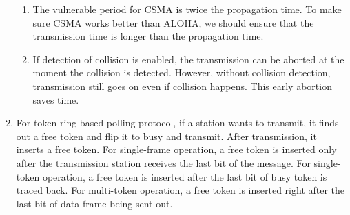 \documentclass{article}
\begin{document}
\begin{enumerate}
\begin{enumerate}
        \item
        The vulnerable period for CSMA is twice the propagation time. To make sure CSMA works better than ALOHA, we should ensure that the transmission time is longer than the propagation time.
        
        \item 
        If detection of collision is enabled, the transmission can be aborted at the moment the collision is detected. However, without collision detection, transmission still goes on even if collision happens. This early abortion saves time.
        
    \end{enumerate}
    
    \item
    For token-ring based polling protocol, if a station wants to transmit, it finds out a free token and flip it to busy and transmit. After transmission, it inserts a free token.
    \newline
    For single-frame operation, a free token is inserted only after the transmission station receives the last bit of the message. 
    \newline
    For single-token operation, a free token is inserted after the last bit of busy token is traced back.
    \newline
    For multi-token operation, a free token is inserted right after the last bit of data frame being sent out.
    
    
\end{enumerate}
\end{document}
